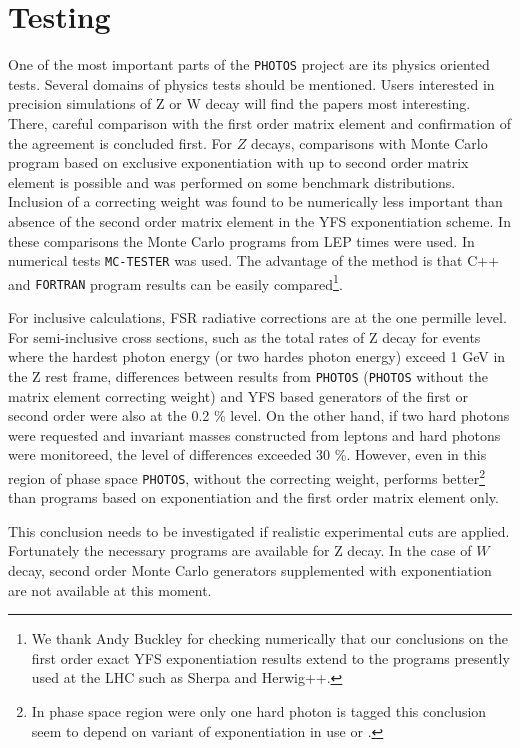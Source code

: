 \documentclass[]{Photos_interface_design}
\begin{document}
\section{Testing}
\label{sec:tests} 
One of the most important parts of the {\tt PHOTOS} project are its physics oriented tests.
Several domains
of physics tests should be mentioned. Users interested in precision 
simulations of Z or W decay  will 
find  the papers \cite{Nanava:2009vg,Golonka:2006tw,Golonka:2005pn}
most interesting. There, careful comparison with the first order matrix element 
and confirmation of the agreement is concluded first.
For $Z$ decays, comparisons  with Monte Carlo program based on exclusive 
exponentiation with up to second order matrix element
is possible and was performed on some benchmark distributions.
Inclusion of a correcting weight was found to be numerically less important
than absence of the second order matrix element in the YFS exponentiation scheme. 
In these comparisons the Monte Carlo programs from LEP times 
\cite{koralz4:1994,kkcpc:1999} were used. In numerical tests {\tt MC-TESTER} \cite{Davidson:2008ma}
was used. The advantage of the method is that C++ and {\tt FORTRAN} program
results can be easily compared\footnote{We thank Andy Buckley for checking numerically
 that our conclusions on the first order exact YFS exponentiation results extend
to the programs presently used at the LHC such as  
Sherpa and Herwig++.  }.
 
For inclusive calculations, FSR radiative corrections are at the one permille level.
For semi-inclusive cross sections, such as the total rates of Z decay for events
where the hardest photon energy (or two hardes photon energy)   exceed 1 GeV in the Z rest frame, differences
between results from {\tt PHOTOS} ({\tt PHOTOS}  without the matrix element correcting weight)
and YFS based generators of the first or second order were also 
at the 0.2 \% level. 
On the other hand, if two  hard photons were requested and invariant masses constructed from leptons
and hard photons were monitoreed,
 the level of differences exceeded 
 30 \%. However, even in this region of phase space {\tt PHOTOS},  without the correcting
weight, performs better\footnote{In 
  phase space region were only one hard photon is tagged this conclusion seem to depend
  on variant of exponentiation in use \cite{koralz4:1994} or \cite{kkcpc:1999}.
                                }
than programs based on exponentiation and the first order matrix element only. 

This conclusion needs to be investigated if   
realistic experimental 
cuts are applied. Fortunately the necessary programs are available for Z decay.
In the case of $W$ decay, second order Monte Carlo generators supplemented with 
exponentiation are not available at this moment.
 
\end{document}
